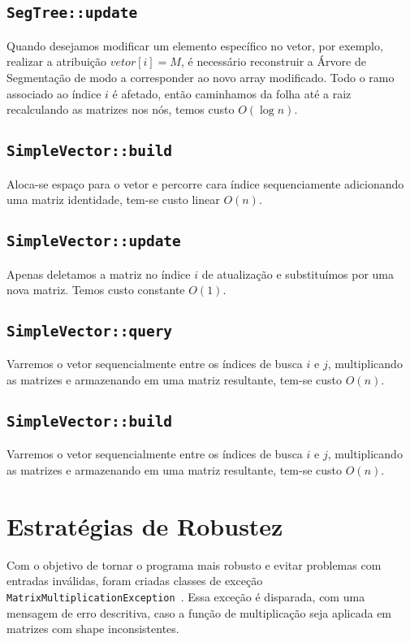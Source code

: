 \documentclass{article}
\begin{document}
\subsection{\texttt{SegTree::update}}

Quando desejamos modificar um elemento específico no vetor, por exemplo, realizar a atribuição \(vetor[i] = M\), é necessário reconstruir a Árvore de Segmentação de modo a corresponder ao novo array modificado. Todo o ramo associado ao índice $i$ é afetado, então caminhamos da folha até a raiz recalculando as matrizes nos nós, temos custo  \(O(\log n)\).

\subsection{\texttt{SimpleVector::build}}
Aloca-se espaço para o vetor e percorre cara índice sequenciamente adicionando uma matriz identidade, tem-se custo linear \(O(n)\).

\subsection{\texttt{SimpleVector::update}}
Apenas deletamos a matriz no índice $i$ de atualização e substituímos por uma nova matriz. Temos custo constante  \(O(1)\).

\subsection{\texttt{SimpleVector::query}}
Varremos o vetor sequencialmente entre os índices de busca $i$ e $j$, multiplicando as matrizes e armazenando em uma matriz resultante, tem-se custo  \(O(n)\).

\subsection{\texttt{SimpleVector::build}}
Varremos o vetor sequencialmente entre os índices de busca $i$ e $j$, multiplicando as matrizes e armazenando em uma matriz resultante, tem-se custo  \(O(n)\).




\section{Estratégias de Robustez}
Com o objetivo de tornar o programa mais robusto e evitar problemas com entradas inválidas, foram criadas classes de exceção \texttt{MatrixMultiplicationException }. Essa exceção é disparada, com uma mensagem de erro descritiva, caso a função de multiplicação seja aplicada em matrizes com shape inconsistentes.
\end{document}
